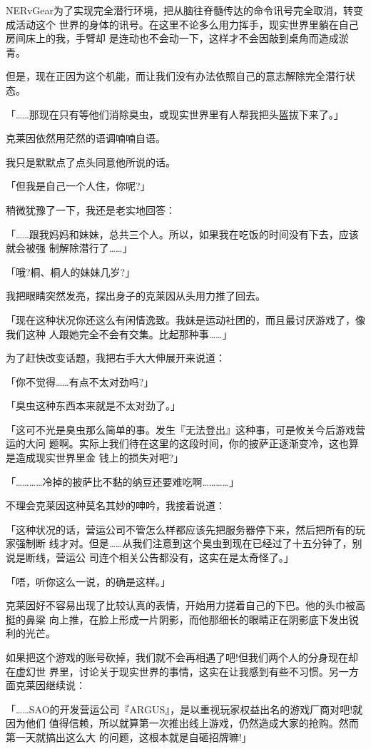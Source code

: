 \documentclass[11pt]{book}
\begin{document}
NERvGear为了实现完全潜行环境，把从脑往脊髓传达的命令讯号完全取消，转变成活动这个
世界的身体的讯号。在这里不论多么用力挥手，现实世界里躺在自己房间床上的我，手臂却
是连动也不会动一下，这样才不会因敲到桌角而造成淤青。

但是，现在正因为这个机能，而让我们没有办法依照自己的意志解除完全潜行状态。

「……那现在只有等他们消除臭虫，或现实世界里有人帮我把头盔拔下来了。」

克莱因依然用茫然的语调喃喃自语。

我只是默默点了点头同意他所说的话。

「但我是自己一个人住，你呢?」

稍微犹豫了一下，我还是老实地回答：

「……跟我妈妈和妹妹，总共三个人。所以，如果我在吃饭的时间没有下去，应该就会被强
制解除潜行了……」

「哦?桐、桐人的妹妹几岁?」

我把眼睛突然发亮，探出身子的克莱因从头用力推了回去。

「现在这种状况你还这么有闲情逸致。我妹是运动社团的，而且最讨厌游戏了，像我们这种
人跟她完全不会有交集。比起那种事……」

为了赶快改变话题，我把右手大大伸展开来说道：

「你不觉得……有点不太对劲吗?」

「臭虫这种东西本来就是不太对劲了。」

「这可不光是臭虫那么简单的事。发生『无法登出』这种事，可是攸关今后游戏营运的大问
题啊。实际上我们待在这里的这段时间，你的披萨正逐渐变冷，这也算是造成现实世界里金
钱上的损失对吧?」

「…………冷掉的披萨比不黏的纳豆还要难吃啊…………」

不理会克莱因这种莫名其妙的呻吟，我接着说道：

「这种状况的话，营运公司不管怎么样都应该先把服务器停下来，然后把所有的玩家强制断
线才对。但是……从我们注意到这个臭虫到现在已经过了十五分钟了，别说是断线，营运公
司连个相关公告都没有，这实在是太奇怪了。」

「唔，听你这么一说，的确是这样。」

克莱因好不容易出现了比较认真的表情，开始用力搓着自己的下巴。他的头巾被高挺的鼻粱
向上推，在脸上形成一片阴影，而他那细长的眼睛正在阴影底下发出锐利的光芒。

如果把这个游戏的账号砍掉，我们就不会再相遇了吧!但我们两个人的分身现在却在虚幻世
界里，讨论关于现实世界的事情，这实在让我感到有些不习惯。另一方面克莱因继续说：

「……SAO的开发营运公司『ARGUS』，是以重视玩家权益出名的游戏厂商对吧!就因为他们
值得信赖，所以就算第一次推出线上游戏，仍然造成大家的抢购。然而第一天就搞出这么大
的问题，这根本就是自砸招牌嘛!」
\end{document}
